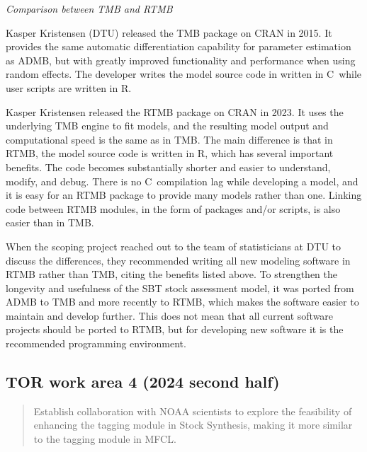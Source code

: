 \documentclass{SCreport}
\newcommand\cpp{\mbox{C\raisebox{0.5ex}{\tiny\bfseries ++}}}
\begin{document}
\vspace{2ex}

\textit{Comparison between TMB and RTMB}

Kasper Kristensen (DTU) released the TMB package on CRAN in 2015. It provides
the same automatic differentiation capability for parameter estimation as ADMB,
but with greatly improved functionality and performance when using random
effects. The developer writes the model source code in written in \cpp\, while
user scripts are written in R.

Kasper Kristensen released the RTMB package on CRAN in 2023. It uses the
underlying TMB engine to fit models, and the resulting model output and
computational speed is the same as in TMB. The main difference is that in RTMB,
the model source code is written in R, which has several important benefits. The
code becomes substantially shorter and easier to understand, modify, and debug.
There is no \cpp\ compilation lag while developing a model, and it is easy for
an RTMB package to provide many models rather than one. Linking code between
RTMB modules, in the form of packages and/or scripts, is also easier than in
TMB.

When the scoping project reached out to the team of statisticians at DTU to
discuss the differences, they recommended writing all new modeling software in
RTMB rather than TMB, citing the benefits listed above. To strengthen the
longevity and usefulness of the SBT stock assessment model, it was ported from
ADMB to TMB and more recently to RTMB, which makes the software easier to
maintain and develop further. This does not mean that all current software
projects should be ported to RTMB, but for developing new software it is the
recommended programming environment.

\vspace{2ex}

\hypertarget{link:tor-4}{}
\subsection{TOR work area 4 (2024 second half)}
\label{sec:tor-4}

\begin{quote}\sf
  Establish collaboration with NOAA scientists to explore the feasibility of
  enhancing the tagging module in Stock Synthesis, making it more similar to the
  tagging module in MFCL.
\end{quote}

\vspace{2ex}
\end{document}
